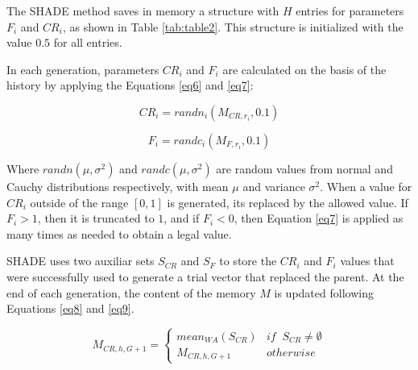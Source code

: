 \documentclass[review]{elsarticle}
\begin{document}
The SHADE method saves in memory a structure with $H$ entries for parameters $F_i$ and $CR_i$, as shown in Table \ref{tab:table2}. This structure is initialized with the value $0.5$ for all entries.

\begin{table}[!h]
	\centering
	\setlength{\tabcolsep}{13pt}
	\caption{The historical memory $M_{CR}$, $M_{F}$  \cite{tanabe2013success}}
	\label{tab:table2}
\end{table}

In each generation, parameters $CR_i$ and $F_i$ are calculated on the basis of the history by applying the Equations \eqref{eq6} and \eqref{eq7}:

\begin{equation}
CR_i = randn_i(M_{CR,r_i}, 0.1)
\label{eq6}
\end{equation}

\begin{equation}
F_i = randc_i(M_{F,r_i}, 0.1)
\label{eq7}
\end{equation}

Where $randn(\mu, \sigma^2)$ and $randc(\mu, \sigma^2)$ are random values from normal and Cauchy distributions respectively, with mean $\mu$ and variance $\sigma^2$. When a value for $CR_i$ outside of the range $[0,1]$ is generated, its replaced by the allowed value. If $F_i > 1$, then it is truncated to $1$, and if $F_i < 0$, then Equation \eqref{eq7} is applied as many times as needed to obtain a legal value.

SHADE uses two auxiliar sets $S_{CR}$ and $S_F$ to store the $CR_i$ and $F_i$ values that were successfully used to generate a trial vector that replaced the parent. At the end of each generation, the content of the memory $M$ is updated following Equations \eqref{eq8} and \eqref{eq9}.

\begin{equation}
M_{CR,h,G+1} = \left\{ \begin{array}{lc}
mean_{WA} (S_{CR}) &   if \;\; S_{CR} \neq \emptyset \\
M_{CR,h,G+1} &  otherwise
\end{array}
\right.
\label{eq8}
\end{equation}
\end{document}
